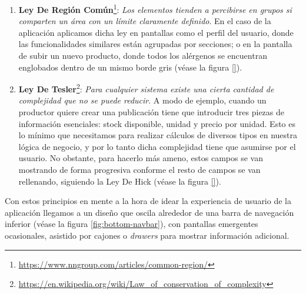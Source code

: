 \begin{enumerate}
    \item \textbf{Ley De Región Común}\footnote{\url{https://www.nngroup.com/articles/common-region/}}: \textit{Los elementos tienden a percibirse en grupos si comparten un área con un límite claramente definido}. En el caso de la aplicación aplicamos dicha ley en pantallas como el perfil del usuario, donde las funcionalidades similares están agrupadas por secciones; o en la pantalla de subir un nuevo producto, donde todos los alérgenos se encuentran englobados dentro de un mismo borde gris (véase la figura \ref{}).

    \item \textbf{Ley De Tesler}\footnote{\url{https://en.wikipedia.org/wiki/Law_of_conservation_of_complexity}}: \textit{Para cualquier sistema existe una cierta cantidad de complejidad que no se puede reducir}. A modo de ejemplo, cuando un productor quiere crear una publicación tiene que introducir tres piezas de información esenciales: stock disponible, unidad y precio por unidad. Esto es lo mínimo que necesitamos para realizar cálculos de diversos tipos en nuestra lógica de negocio, y por lo tanto dicha complejidad tiene que asumirse por el usuario. No obstante, para hacerlo más ameno, estos campos se van mostrando de forma progresiva conforme el resto de campos se van rellenando, siguiendo la Ley De Hick (véase la figura \ref{}).
    
\end{enumerate}


Con estos principios en mente a la hora de idear la experiencia de usuario de la aplicación llegamos a un diseño que oscila alrededor de una barra de navegación inferior (véase la figura \ref{fig:bottom-navbar}), con pantallas emergentes ocasionales, asistido por cajones o \textit{drawers} para mostrar información adicional.


